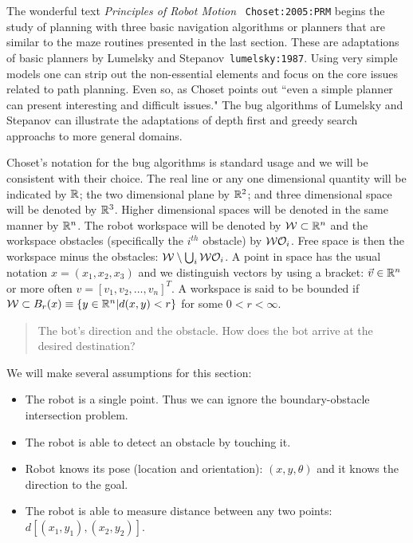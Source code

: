 The wonderful text \emph{Principles of Robot Motion}~
\texttt{Choset:2005:PRM} begins the study of planning with three basic
navigation algorithms or planners that are similar to the maze routines
presented in the last section. These are adaptations of basic planners
by Lumelsky and Stepanov~\texttt{lumelsky:1987}. Using very simple
models one can strip out the non-essential elements and focus on the
core issues related to path planning. Even so, as Choset points out
``even a simple planner can present interesting and difficult issues."
The bug algorithms of Lumelsky and Stepanov can illustrate the
adaptations of depth first and greedy search approachs to more general
domains.

Choset's notation for the bug algorithms is standard usage and we will
be consistent with their choice. The real line or any one dimensional
quantity will be indicated by \(\Bbb R\); the two dimensional plane by
\(\Bbb R^2\); and three dimensional space will be denoted by
\(\Bbb R^3\). Higher dimensional spaces will be denoted in the same
manner by \(\Bbb R^n\). The robot workspace will be denoted by
\({\cal W} \subset \Bbb R^n\) and the workspace obstacles (specifically
the \(i^{th}\) obstacle) by \({\cal W}{\cal O}_i\). Free space is then
the workspace minus the obstacles:
\({\cal W}\setminus \bigcup_i {\cal W}{\cal O}_i\). A point in space has
the usual notation \(x = (x_1, x_2, x_3)\) and we distinguish vectors by
using a bracket: \(\vec{v} \in \Bbb R^n\) or more often
\(v = [v_1, v_2, \dots , v_n]^T\). A workspace is said to be bounded if
\({\cal W} \subset B_r(x) \equiv \{ y \in \Bbb R^n | d(x,y) < r\}\) for
some \(0 < r < \infty\).

\begin{quote}
The bot's direction and the obstacle. How does the bot arrive at the
desired destination?
\end{quote}

We will make several assumptions for this section:

\begin{itemize}
\tightlist
\item
  The robot is a single point. Thus we can ignore the boundary-obstacle
  intersection problem.
\item
  The robot is able to detect an obstacle by touching it.
\item
  Robot knows its pose (location and orientation): \((x,y,\theta)\) and
  it knows the direction to the goal.
\item
  The robot is able to measure distance between any two points:
  \(d[(x_1,y_1),(x_2,y_2)]\).
\end{itemize}

